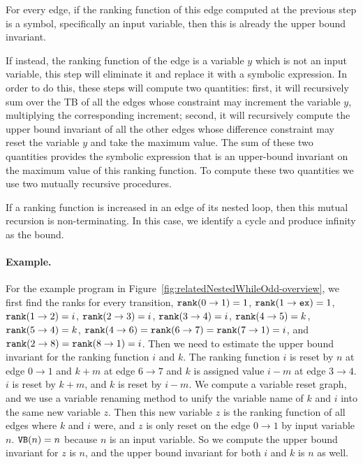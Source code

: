  For every edge, if the ranking function of this edge computed at the previous step is a symbol, specifically an input variable, then this is already the upper bound invariant. 

 If instead, the ranking function of the edge is a variable $y$ which is not an input variable, this step will eliminate it and replace it with a symbolic expression. 
 In order to do this, these steps will compute two quantities: first, it will recursively sum over the TB of all the edges whose constraint may increment the variable $y$, multiplying the corresponding increment; second, it will recursively compute the upper bound invariant of all the other edges whose difference constraint may reset the variable $y$ and take the maximum value. The sum of these two quantities provides the symbolic expression that is an upper-bound invariant on the maximum value of this ranking function. To compute these two quantities we use two mutually recursive procedures.
 
 If a ranking function is increased in an edge of its nested loop, then this mutual recursion is non-terminating. In this case, we identify a cycle and produce infinity as the bound.
 
%
\paragraph{Example.}
For the example program in Figure~\ref{fig:relatedNestedWhileOdd-overview}, we first find the ranks for every transition,
$\mathtt{rank}(0 \to 1) = 1$,
$\mathtt{rank}(1 \to \mathtt{ex}) = 1$,
$\mathtt{rank}(1 \to 2) = i$,
$\mathtt{rank}(2 \to 3) = i$,
$\mathtt{rank}(3 \to 4) = i$,
$\mathtt{rank}(4 \to 5) = k$,
$\mathtt{rank}(5 \to 4) = k$,
$\mathtt{rank}(4\to 6) = \mathtt{rank}(6 \to 7) = \mathtt{rank}(7 \to 1) = i$,
and $\mathtt{rank}(2 \to 8) = \mathtt{rank}(8 \to 1) = i$.
Then we need to estimate the upper bound invariant for the ranking function $i$ and $k$.
The ranking function $i$ is reset by $n$ at edge $0 \to 1$ and 
$k + m$ at edge $6 \to 7$ and $k$ is assigned value $i - m$ at edge $3 \to 4$. 
$i$ is reset by $k+m$, and $k$ is reset by $i - m$.
 We compute a variable reset graph, and we use a variable renaming method to unify the variable name of $k$ and $i$ into the same new variable $z$.
 Then this new variable $z$ is the ranking function of all edges where $k$ and $i$ were, and $z$ is only reset on the edge $0 \to 1$ by input variable $n$. ${\mathtt{VB}}(n) = n$ because $n$ is an input variable.
 So we compute the upper bound invariant for $z$ is $n$, and
 the upper bound invariant for both $i$ and $k$ is $n$ as well.
